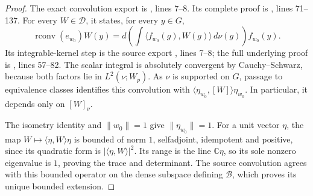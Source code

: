 \begin{proof}
The exact convolution export is
,
lines 7--8. Its complete proof is
, lines 71--137.
For every \(W\in\mathcal D\), it states, for every \(y\in G\),
\[
 \operatorname{rconv}(e_{w_0})W(y)
 =d\left(\int\langle f_{w_0}(g),W(g)\rangle\,d\nu(g)\right)
      f_{w_0}(y).
\]
Its integrable-kernel step is the source export
, lines 7--8;
the full underlying proof is
, lines 57--82.
The scalar integral is absolutely convergent by Cauchy--Schwarz,
because both factors lie in \(L^2(\nu;W_p)\).
As \(\nu\) is supported on \(G\), passage to equivalence classes
identifies this convolution with
\(\langle\eta_{w_0},[W]\rangle\eta_{w_0}\).
In particular, it depends only on \([W]_\nu\).

The isometry identity and \(\|w_0\|=1\) give
\(\|\eta_{w_0}\|=1\).
For a unit vector \(\eta\), the map \(W\mapsto\langle\eta,W\rangle\eta\)
is bounded of norm \(1\), selfadjoint, idempotent and positive,
since its quadratic form is \(|\langle\eta,W\rangle|^2\).
Its range is the line \(\mathbb C\eta\), so its sole nonzero
eigenvalue is \(1\), proving the trace and determinant.
The source convolution agrees with this bounded operator on the
dense subspace defining \(\mathcal B\), which proves its unique
bounded extension.
\end{proof}

